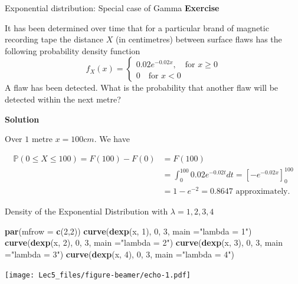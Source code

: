 \documentclass[ignorenonframetext,]{beamer}
\newenvironment{Shaded}{\begin{snugshade}}{\end{snugshade}}
\newcommand{\KeywordTok}[1]{\textcolor[rgb]{0.13,0.29,0.53}{\textbf{#1}}}
\newcommand{\DataTypeTok}[1]{\textcolor[rgb]{0.13,0.29,0.53}{#1}}
\newcommand{\DecValTok}[1]{\textcolor[rgb]{0.00,0.00,0.81}{#1}}
\newcommand{\StringTok}[1]{\textcolor[rgb]{0.31,0.60,0.02}{#1}}
\newcommand{\NormalTok}[1]{#1}
\begin{document}
\begin{frame}{Exponential distribution: Special case of Gamma}
\textbf{Exercise}

It has been determined over time that for a particular brand of magnetic
recording tape the distance \(X\) (in centimetres) between surface flaws
has the following probability density function
\[f_X(x)=\begin{cases} 0.02 e^{-0.02 x},\quad\text{for}\,\,x\ge 0\\ 0\quad\text{for}\,\,x< 0 \end{cases}\]
A flaw has been detected. What is the probability that another flaw will
be detected within the next metre?

\textbf{Solution}

Over \(1\) metre \(x=100cm\). We have

\begin{align*}
\mathbb{P}(0\le X\le 100)=F(100)-F(0)&=F(100)\\
&=\int^{100}_0 0.02 e^{-0.02 t}dt=[-e^{-0.02x}]^{100}_0\\
&=1-e^{-2}=0.8647\,\,\text{approximately.}
\end{align*}

\end{frame}

\begin{frame}[fragile]{Density of the Exponential Distribution with
\(\lambda=1,2,3,4\)}

\begin{Shaded}
\begin{Highlighting}[]
\KeywordTok{par}\NormalTok{(}\DataTypeTok{mfrow =} \KeywordTok{c}\NormalTok{(}\DecValTok{2}\NormalTok{,}\DecValTok{2}\NormalTok{))}
\KeywordTok{curve}\NormalTok{(}\KeywordTok{dexp}\NormalTok{(x, }\DecValTok{1}\NormalTok{), }\DecValTok{0}\NormalTok{, }\DecValTok{3}\NormalTok{, }\DataTypeTok{main =}\StringTok{"lambda = 1"}\NormalTok{)}
\KeywordTok{curve}\NormalTok{(}\KeywordTok{dexp}\NormalTok{(x, }\DecValTok{2}\NormalTok{), }\DecValTok{0}\NormalTok{, }\DecValTok{3}\NormalTok{, }\DataTypeTok{main =}\StringTok{"lambda = 2"}\NormalTok{) }
\KeywordTok{curve}\NormalTok{(}\KeywordTok{dexp}\NormalTok{(x, }\DecValTok{3}\NormalTok{), }\DecValTok{0}\NormalTok{, }\DecValTok{3}\NormalTok{, }\DataTypeTok{main =}\StringTok{"lambda = 3"}\NormalTok{) }
\KeywordTok{curve}\NormalTok{(}\KeywordTok{dexp}\NormalTok{(x, }\DecValTok{4}\NormalTok{), }\DecValTok{0}\NormalTok{, }\DecValTok{3}\NormalTok{, }\DataTypeTok{main =}\StringTok{"lambda = 4"}\NormalTok{)}
\end{Highlighting}
\end{Shaded}

\texttt{[image: Lec5\_files/figure-beamer/echo-1.pdf]}

\end{frame}
\end{document}

